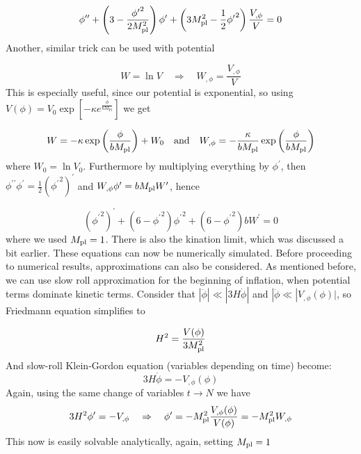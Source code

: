 \begin{equation}
    \phi^{\prime \prime} + \left( 3 - \frac{{\phi^{\prime}}^2}{2 M_{\rm pl}^2} \right) \phi^{\prime} + \left( 3 M_{\rm pl}^2 - \frac{1}{2} {\phi^{\prime}}^2 \right) \frac{V_{, \phi}}{V} = 0
\end{equation}
Another, similar trick can be used with potential

\begin{equation}
    W = \ln V \quad \Rightarrow \quad W_{, \phi} = \frac{V_{, \phi}}{V}
\end{equation}
This is especially useful, since our potential is exponential, so using $V(\phi) = V_0 \exp \left[ - \kappa e^{\frac{\phi}{b M_{\text{Pl}}}} \right]$ we get

\begin{equation}
    W = - \kappa \exp \left( \frac{\phi}{b M_{\rm pl}} \right) + W_0 \quad \text{and} \quad W_{, \phi} = -\frac{\kappa}{b M_{\rm pl}} \exp \left( \frac{\phi}{b M_{\rm pl}} \right)
\end{equation}
where $W_0 = \ln V_0$. Furthermore by multiplying everything by $\phi^{\prime}$, then $\phi^{\prime \prime} \phi^{\prime} = \frac{1}{2} ({\phi^{\prime}}^{2})^{\prime}$ and $W_{, \phi} \phi^{\prime} = b M_{\rm pl} W^{\prime}$, hence

\begin{equation}
    ({\phi^{\prime}}^{2})^{\prime} + \left( 6 - {\phi^{\prime}}^2 \right) {\phi^{\prime}}^2 + \left( 6 - {\phi^{\prime}}^2 \right) b W^{\prime} = 0
\end{equation}
where we used $M_{\rm pl} = 1$. There is also the kination limit, which was discussed a bit earlier. These equations can now be numerically simulated. Before proceeding to numerical results, approximations can also be considered. As mentioned before, we can use slow roll approximation for the beginning of inflation, when potential terms dominate kinetic terms. Consider that $|\ddot{\phi} | \ll |3 H \dot{\phi}|$ and $|\ddot{\phi} \ll |V_{, \phi} (\phi)|$, so Friedmann equation simplifies to

\begin{equation}
    H^2 = \frac{V(\phi)}{3 M_{\rm pl}^2}
\end{equation}
And slow-roll Klein-Gordon equation (variables depending on time) become:
\begin{equation}
    3H \dot{\phi} = - V_{, \phi}(\phi)
\end{equation}
Again, using the same change of variables $t \rightarrow N$ we have
\begin{equation}
    3H^2 \phi^{\prime} = - V_{, \phi} \quad \Rightarrow \quad \phi^{\prime} = - M_{\rm pl}^2 \frac{V_{, \phi}(\phi)}{V(\phi)} = - M_{\rm pl}^2 W_{, \phi}
\end{equation}
This now is easily solvable analytically, again, setting $M_{\rm pl} = 1$


